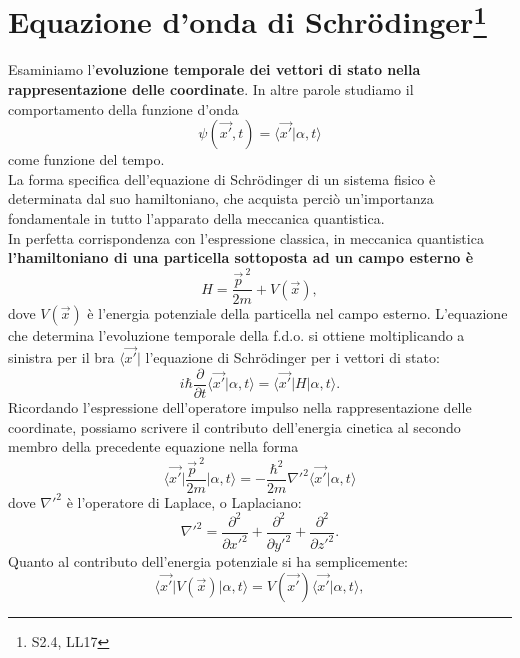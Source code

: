 \documentclass[a4paper,12pt,oneside]{book}
\begin{document}
\section[ Equazione d'onda di Schrödinger]{Equazione d'onda di Schr\"{o}dinger\footnote{S2.4, LL17}}
Esaminiamo l'\textbf{evoluzione temporale dei vettori di stato nella rappresentazione delle coordinate}. In altre parole studiamo il comportamento della funzione d'onda
\begin{equation}
\psi (\vec{x'}, t) = \langle \vec{x'}\vert \alpha, t \rangle
\end{equation}
come funzione del tempo.\\
La forma specifica dell'equazione di Schr\"{o}dinger di un sistema fisico è determinata dal suo hamiltoniano, che acquista perciò un'importanza fondamentale in tutto l'apparato della meccanica quantistica.\\
In perfetta corrispondenza con l'espressione classica, in meccanica quantistica \textbf{l'hamiltoniano di una particella sottoposta ad un campo esterno è}
\begin{equation}
H= \frac{\vec{p}^{\ 2}}{2m}+V(\vec{x}),
\label{eq:cap8_5}
\end{equation}
dove $V(\vec{x})$ è l'energia potenziale della particella nel campo esterno.		
L'equazione che determina l'evoluzione temporale della f.d.o. si ottiene moltiplicando a sinistra per il bra $\langle \vec{x'}\vert $ l'equazione di Schr\"{o}dinger per i vettori di stato:
\begin{equation}
i\hbar \frac{\partial}{\partial t} \langle \vec{x'}\vert \alpha , t \rangle = \langle \vec{x'}\vert H \vert \alpha , t \rangle.
\end{equation}
Ricordando l'espressione dell'operatore impulso nella rappresentazione delle coordinate, possiamo scrivere il contributo dell'energia cinetica al secondo membro della precedente equazione nella forma
\begin{equation}
\langle \vec{x'}\vert \frac{\vec{p}^{\ 2}}{2m} \vert \alpha , t \rangle = -\frac{\hbar^2}{2m}{{\nabla}'}^2\langle \vec{x'}\vert \alpha , t \rangle
\end{equation}
dove ${{\nabla}'}^2$ è l'operatore di Laplace, o Laplaciano:
\begin{equation}
{{\nabla}'}^2= \frac{\partial ^2}{\partial {x'} ^2}+\frac{\partial ^2}{\partial {y'} ^2}+\frac{\partial ^2}{\partial {z'} ^2}.
\end{equation}
Quanto al contributo dell'energia potenziale si ha semplicemente:
\begin{equation}
\langle \vec{x'}\vert V(\vec{x}) \vert \alpha , t \rangle = V(\vec{x'})\langle \vec{x'}  \vert \alpha , t \rangle ,
\end{equation}
\end{document}
